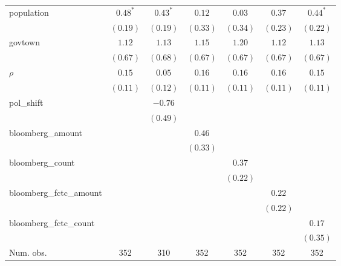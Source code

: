 \begin{table}[!h]
\begin{center}
\begin{tabular}{l c c c c c c }
population              & $0.48^{*}$   & $0.43^{*}$   & $0.12$       & $0.03$       & $0.37$       & $0.44^{*}$   \\
                        & $(0.19)$     & $(0.19)$     & $(0.33)$     & $(0.34)$     & $(0.23)$     & $(0.22)$     \\
govtown                 & $1.12$       & $1.13$       & $1.15$       & $1.20$       & $1.12$       & $1.13$       \\
                        & $(0.67)$     & $(0.68)$     & $(0.67)$     & $(0.67)$     & $(0.67)$     & $(0.67)$     \\
$\rho$                  & $0.15$       & $0.05$       & $0.16$       & $0.16$       & $0.16$       & $0.15$       \\
                        & $(0.11)$     & $(0.12)$     & $(0.11)$     & $(0.11)$     & $(0.11)$     & $(0.11)$     \\
pol\_shift              &              & $-0.76$      &              &              &              &              \\
                        &              & $(0.49)$     &              &              &              &              \\
bloomberg\_amount       &              &              & $0.46$       &              &              &              \\
                        &              &              & $(0.33)$     &              &              &              \\
bloomberg\_count        &              &              &              & $0.37$       &              &              \\
                        &              &              &              & $(0.22)$     &              &              \\
bloomberg\_fctc\_amount &              &              &              &              & $0.22$       &              \\
                        &              &              &              &              & $(0.22)$     &              \\
bloomberg\_fctc\_count  &              &              &              &              &              & $0.17$       \\
                        &              &              &              &              &              & $(0.35)$     \\
\midrule
Num. obs.               & 352          & 310          & 352          & 352          & 352          & 352          \\

\end{tabular}
\end{center}
\end{table}
